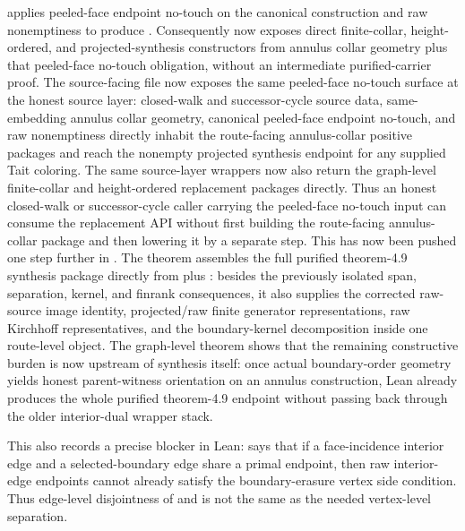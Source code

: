 \documentclass[11pt]{article}
\begin{document}
applies peeled-face endpoint no-touch on the canonical construction
and raw  nonemptiness to produce
.  Consequently
 now exposes direct
finite-collar, height-ordered, and projected-synthesis constructors from
annulus collar geometry plus that peeled-face no-touch obligation, without an
intermediate purified-carrier proof.
The source-facing file
 now exposes the
same peeled-face no-touch surface at the honest source layer: closed-walk and
successor-cycle source data, same-embedding annulus collar geometry, canonical
peeled-face endpoint no-touch, and raw
 nonemptiness directly inhabit the
route-facing annulus-collar positive packages and reach the nonempty projected
synthesis endpoint for any supplied Tait coloring.
The same source-layer wrappers now also return the graph-level finite-collar
and height-ordered replacement packages directly.  Thus an honest closed-walk
or successor-cycle caller carrying the peeled-face no-touch input can consume
the replacement API without first building the route-facing annulus-collar
package and then lowering it by a separate step.
This has now been pushed one step further in
.  The theorem
assembles the full purified theorem-4.9 synthesis package directly from
 plus
: besides the previously isolated span,
separation, kernel, and finrank consequences, it also supplies the corrected
raw-source image identity, projected/raw finite generator representations, raw
Kirchhoff representatives, and the boundary-kernel decomposition inside one
route-level object.  The graph-level theorem
shows that the remaining constructive burden is now upstream of synthesis
itself: once actual boundary-order geometry yields honest parent-witness
orientation on an annulus construction, Lean already produces the whole
purified theorem-4.9 endpoint without passing back through the older
interior-dual wrapper stack.

This also records a precise blocker in Lean:
says that if a face-incidence interior edge and a selected-boundary edge share
a primal endpoint, then raw interior-edge endpoints cannot already satisfy the
boundary-erasure vertex side condition.  Thus edge-level disjointness of
 and  is not the same
as the needed vertex-level separation.
\end{document}
